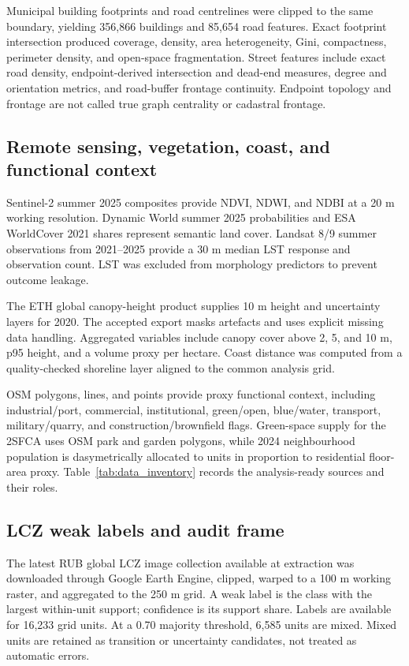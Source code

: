 Municipal building footprints and road centrelines
were clipped to the same boundary, yielding 356,866 buildings and 85,654 road
features. Exact footprint intersection produced coverage, density, area
heterogeneity, Gini, compactness, perimeter density, and open-space
fragmentation. Street features include exact road density, endpoint-derived
intersection and dead-end measures, degree and orientation metrics, and
road-buffer frontage continuity. Endpoint topology and frontage are not called
true graph centrality or cadastral frontage.

\subsection{Remote sensing, vegetation, coast, and functional context}

Sentinel-2 summer 2025 composites provide NDVI, NDWI, and NDBI at a 20 m working
resolution. Dynamic World summer 2025 probabilities and ESA WorldCover 2021
shares represent semantic land cover. Landsat 8/9 summer observations from
2021--2025 provide a 30 m median LST response and observation count. LST was
excluded from morphology predictors to prevent outcome leakage.

The ETH global canopy-height product supplies 10 m height and uncertainty
layers for 2020. The accepted export masks artefacts and uses explicit missing
data handling. Aggregated variables include canopy cover above 2, 5, and 10 m,
p95 height, and a volume proxy per hectare. Coast distance was computed from a
quality-checked shoreline layer aligned to the common analysis grid.

OSM polygons, lines, and points provide proxy functional context, including
industrial/port, commercial, institutional, green/open, blue/water, transport,
military/quarry, and construction/brownfield flags. Green-space supply for the 2SFCA uses OSM park and garden
polygons, while 2024 neighbourhood population is dasymetrically allocated to
units in proportion to residential floor-area proxy. Table~\ref{tab:data_inventory}
records the analysis-ready sources and their roles.



\subsection{LCZ weak labels and audit frame}

The latest RUB global LCZ image collection available at extraction was
downloaded through Google Earth Engine, clipped, warped to a 100 m working
raster, and aggregated to the 250 m grid. A weak label is the class with the
largest within-unit support; confidence is its support share. Labels are
available for 16,233 grid units. At a 0.70 majority threshold, 6,585 units are mixed.
Mixed units are retained as transition or uncertainty candidates, not treated
as automatic errors.

